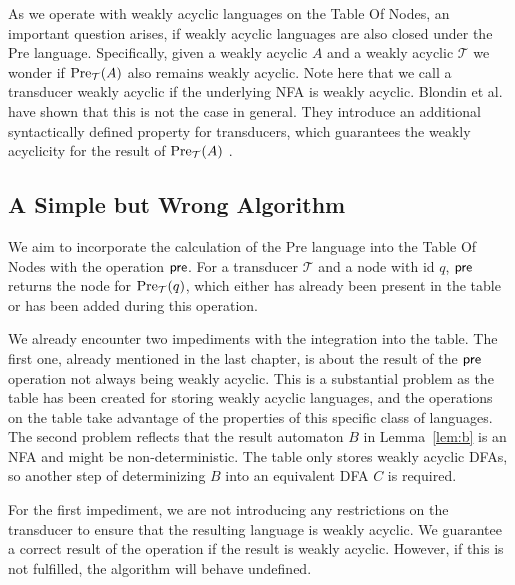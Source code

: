 As we operate with weakly acyclic languages on the Table Of Nodes, an important question arises, if weakly acyclic languages are also closed under the Pre language. Specifically, given a weakly acyclic $A$ and a weakly acyclic $\mathcal{T}$ we wonder if $\operatorname{\text{Pre}}_{\mathcal{T}}(A)$ also remains weakly acyclic. Note here that we call a transducer weakly acyclic if the underlying NFA is weakly acyclic. Blondin et al. have shown that this is not the case in general. They introduce an additional syntactically defined property for transducers, which guarantees the weakly acyclicity for the result of $\operatorname{\text{Pre}}_{\mathcal{T}}(A)$ \cite{blondin_24}.

\subsection{A Simple but Wrong Algorithm}
We aim to incorporate the calculation of the Pre language into the Table Of Nodes with the operation $\operatorname{\textsf{pre}}$. For a transducer $\mathcal{T}$ and a node with id $q$, $\operatorname{\textsf{pre}}$ returns the node for $\operatorname{\text{Pre}}_{\mathcal{T}}(q)$, which either has already been present in the table or has been added during this operation.

\par

We already encounter two impediments with the integration into the table. The first one, already mentioned in the last chapter, is about the result of the $\operatorname{\textsf{pre}}$ operation not always being weakly acyclic. This is a substantial problem as the table has been created for storing weakly acyclic languages, and the operations on the table take advantage of the properties of this specific class of languages.
The second problem reflects that the result automaton $B$ in Lemma~\ref{lem:b} is an NFA and might be non-deterministic. The table only stores weakly acyclic DFAs, so another step of determinizing $B$ into an equivalent DFA $C$ is required.


\par

For the first impediment, we are not introducing any restrictions on the transducer to ensure that the resulting language is weakly acyclic. We guarantee a correct result of the operation if the result is weakly acyclic. However, if this is not fulfilled, the algorithm will behave undefined.

